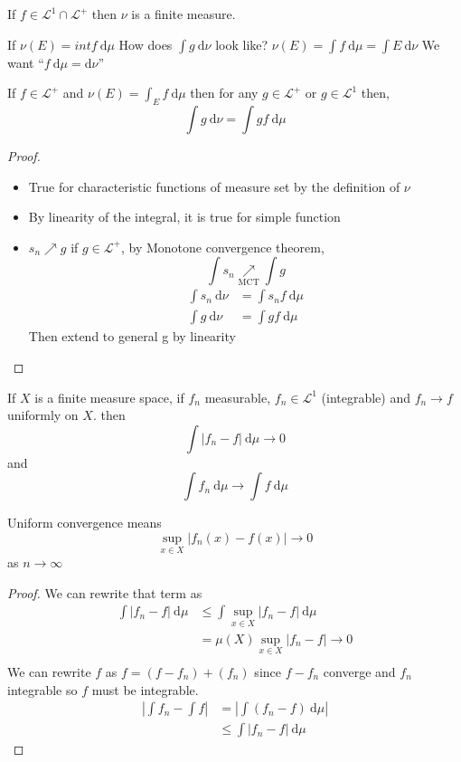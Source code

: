 \begin{claim}
  If $f \in \mathcal{L}^1 \cap \mathcal{L}^+$ then $\nu$ is a finite measure.
\end{claim}

If $\nu(E) = int f  \ \mathrm{d}\mu$
How does $\int g \ \mathrm{d}\nu$ look like?
$\nu(E) = \int f \ \mathrm{d}\mu = \int E \ \mathrm{d}\nu$
We want ``$f\ \mathrm{d}\mu = \mathrm{d}\nu$''
\begin{lemma}
  If $f \in \mathcal{L}^+$ and $\nu(E) = \int_E f \ \mathrm{d}\mu$ then for any $g \in \mathcal{L}^+$ or $g \in \mathcal{L}^1$ then,   
  \[\int g\ \mathrm{d}\nu = \int g f \ \mathrm{d}\mu\]
\end{lemma}

\begin{proof}
  \begin{itemize}
    \item True for characteristic functions of measure set by the definition of $\nu$  
    \item By linearity of the integral, it is true for simple function
    \item  $s_n\nearrow g$ if $g \in \mathcal{L}^+$, by Monotone convergence theorem, 
    \[\int s_n \underset{\text{MCT}}\nearrow \int g\]
    \begin{align*}
      \int s_n \ \mathrm{d}\nu &= \int s_n f \ \mathrm{d}\mu \\
      \int g \ \mathrm{d}\nu &= \int g f \ \mathrm{d}\mu
    \end{align*}
    Then extend to general g by linearity
  \end{itemize}
\end{proof}


\begin{theorem}
  If $X$ is a finite measure space, if $f_n$ measurable, $f_n \in \mathcal{L}^1$ (integrable) and $f_n \to f$ uniformly on $X$. 
  then $$\int |f_n - f| \ \mathrm{d}\mu \to 0$$
  and 
  $$\int f_n\ \mathrm{d}\mu \to \int f\ \mathrm{d}\mu$$
\end{theorem}
  
\begin{remark}
  Uniform convergence means
  \[\sup_{x \in X} |f_n(x) - f(x)| \to 0\]
  as $n \to \infty$
\end{remark}

\begin{proof}
  We can rewrite that term as 
  \begin{align*}
    \int |f_n - f| \ \mathrm{d}\mu &\le \int \sup_{x\in X} |f_n - f|\ \mathrm{d}\mu \\ 
    &= \mu(X) \sup_{x\in X} |f_n - f| \to 0\\
  \end{align*}
  We can rewrite $f$ as $f = (f - f_n) + (f_n)$ since $f-f_n$ converge and $f_n$ integrable so $f$ must be integrable.
  \begin{align*}
    \left|\int f_n - \int f\right| &= \left|\int (f_n - f)\ \mathrm{d}\mu\right| \\
    &\le \int |f_n - f|\ \mathrm{d}\mu 
  \end{align*}
\end{proof}

